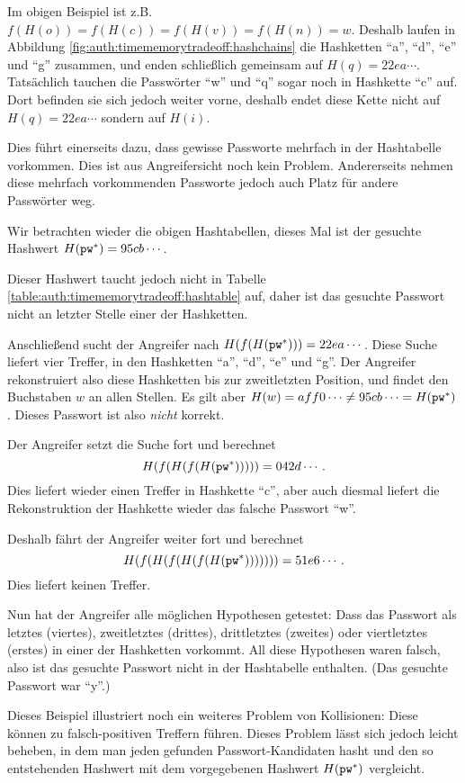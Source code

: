 Im obigen Beispiel ist z.B. $f(H(o)) = f(H(c)) = f(H(v)) = f(H(n)) =
w$. Deshalb laufen in Abbildung
\ref{fig:auth:timememorytradeoff:hashchains} die Hashketten "`a"',
"`d"', "`e"' und "`g"' zusammen, und enden schließlich gemeinsam auf
$H(q) = 22ea\cdots$. Tatsächlich tauchen die Passwörter "`w"' und "`q"'
sogar noch in Hashkette "`c"' auf. Dort befinden sie sich jedoch weiter
vorne, deshalb endet diese Kette nicht auf $H(q) = 22ea\cdots$ sondern
auf $H(i)$.

Dies führt einerseits dazu, dass gewisse Passworte mehrfach in der
Hashtabelle vorkommen. Dies ist aus Angreifersicht noch kein
Problem. Andererseits nehmen diese mehrfach vorkommenden Passworte
jedoch auch Platz für andere Passwörter weg.

\begin{beispiel} Wir betrachten wieder die obigen Hashtabellen, dieses
Mal ist der gesuchte Hashwert $H(\texttt{pw}^*) = 95cb\cdots$.
	
	Dieser Hashwert taucht jedoch nicht in Tabelle
\ref{table:auth:timememorytradeoff:hashtable} auf, daher ist das
gesuchte Passwort nicht an letzter Stelle einer der Hashketten.
	
	Anschließend sucht der Angreifer nach $H(f(H(\texttt{pw}^*))) =
22ea\cdots$. Diese Suche liefert vier Treffer, in den Hashketten "`a"',
"`d"', "`e"' und "`g"'. Der Angreifer rekonstruiert also diese
Hashketten bis zur zweitletzten Position, und findet den Buchstaben $w$
an allen Stellen. Es gilt aber $H(w) = aff0\cdots \neq 95cb\cdots =
H(\texttt{pw}^*)$. Dieses Passwort ist also \emph{nicht} korrekt.
	
	Der Angreifer setzt die Suche fort und berechnet
\[H(f(H(f(H(\texttt{pw}^*))))) = 042d\cdots.\] Dies liefert wieder einen Treffer
in Hashkette "`c"', aber auch diesmal liefert die Rekonstruktion der
Hashkette wieder das falsche Passwort "`w"'.
	
	Deshalb fährt der Angreifer weiter fort und berechnet
\[H(f(H(f(H(f(H(\texttt{pw}^*))))))) = 51e6\cdots.\] Dies liefert keinen Treffer.
	
	Nun hat der Angreifer alle möglichen Hypothesen getestet: Dass
        das Passwort als letztes (viertes), zweitletztes (drittes), drittletztes
        (zweites) oder viertletztes (erstes) in einer der Hashketten vorkommt.
        All diese Hypothesen waren falsch, also ist das gesuchte Passwort nicht
        in der Hashtabelle enthalten.  (Das gesuchte Passwort war "`y"'.)
      \end{beispiel}
      
      Dieses Beispiel illustriert noch ein weiteres Problem von Kollisionen:
Diese können zu falsch-positiven Treffern führen. Dieses Problem lässt
sich jedoch leicht beheben, in dem man jeden gefunden
Passwort-Kandidaten hasht und den so entstehenden Hashwert mit dem
vorgegebenen Hashwert $H(\texttt{pw}^*)$ vergleicht.

